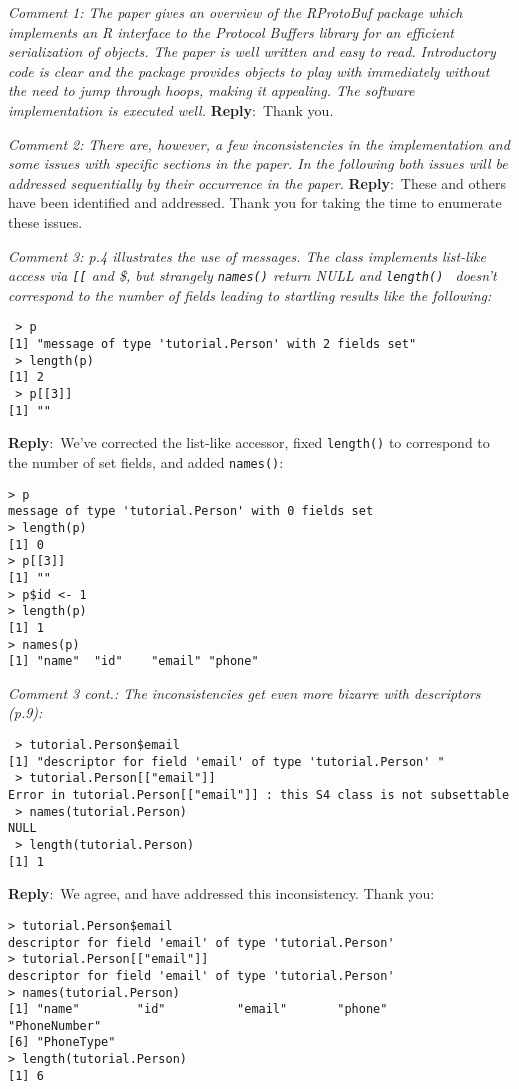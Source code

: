 \documentclass[10pt]{article}
\newcommand{\pointRaised}[2]{\smallskip %
  \textsl{{\fontseries{b}\selectfont #1}: #2}\newline}
\newcommand{\reply}[1]{\textbf{Reply}:\ #1 \smallskip } %
\begin{document}
\pointRaised{Comment 1}{The paper gives an overview of the RProtoBuf package which implements an 
  R interface to the Protocol Buffers library for an efficient 
  serialization of objects. The paper is well written and easy to read. 
  Introductory code is clear and the package provides objects to play with 
  immediately without the need to jump through hoops, making it appealing. 
  The software implementation is executed well.}
\reply{Thank you.}

\pointRaised{Comment 2}{There are, however, a few inconsistencies in the implementation and some 
  issues with specific sections in the paper. In the following both issues 
  will be addressed sequentially by their occurrence in the paper.}
\reply{These and others have been identified and addressed.  Thank you
  for taking the time to enumerate these issues.}

\pointRaised{Comment 3}{p.4 illustrates the use of messages. The class implements list-like 
  access via \texttt{[[} and \$, but strangely \texttt{names()} return NULL and \texttt{length() }
  doesn't correspond to the number of fields leading to startling results like
the following:}

\begin{verbatim}
 > p
[1] "message of type 'tutorial.Person' with 2 fields set"
 > length(p)
[1] 2
 > p[[3]]
[1] ""
\end{verbatim}
\reply{We've corrected the list-like accessor, fixed \texttt{length()} to
  correspond to the number of set fields, and added \texttt{names()}:}
\begin{verbatim}
> p
message of type 'tutorial.Person' with 0 fields set
> length(p)
[1] 0
> p[[3]]
[1] ""
> p$id <- 1
> length(p)
[1] 1
> names(p)
[1] "name"  "id"    "email" "phone"
\end{verbatim}

\pointRaised{Comment 3 cont.}{The inconsistencies get even more bizarre with descriptors (p.9):}

\begin{verbatim}
 > tutorial.Person$email
[1] "descriptor for field 'email' of type 'tutorial.Person' "
 > tutorial.Person[["email"]]
Error in tutorial.Person[["email"]] : this S4 class is not subsettable
 > names(tutorial.Person)
NULL
 > length(tutorial.Person)
[1] 1
\end{verbatim}
\reply{We agree, and have addressed this inconsistency.  Thank you:}
\begin{verbatim}
> tutorial.Person$email
descriptor for field 'email' of type 'tutorial.Person' 
> tutorial.Person[["email"]]
descriptor for field 'email' of type 'tutorial.Person' 
> names(tutorial.Person)
[1] "name"        "id"          "email"       "phone"       "PhoneNumber"
[6] "PhoneType"  
> length(tutorial.Person)
[1] 6
\end{verbatim}
\end{document}
